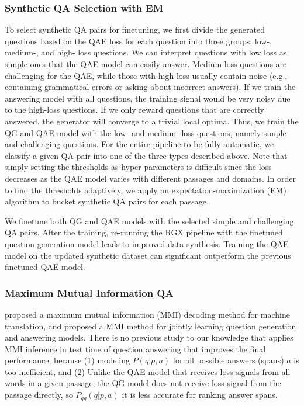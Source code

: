 \documentclass[11pt,a4paper]{article}
\begin{document}
\subsubsection{Synthetic QA Selection with EM}
To select synthetic QA pairs for finetuning, we first divide the generated questions based on the QAE loss for each question into three groups: low-, medium-, and high- loss questions. We can interpret questions with low loss as simple ones that the QAE model can easily answer. Medium-loss questions are challenging for the QAE, while those with high loss usually contain noise (e.g., containing grammatical errors or asking about incorrect answers). If we train the answering model with all questions, the training signal would be very noisy due to the high-loss questions. If we only reward questions that are correctly answered, the generator will converge to a trivial local optima. Thus, we train the QG and QAE model with the low- and medium- loss questions, namely simple and challenging questions. For the entire pipeline to be fully-automatic, we classify a given QA pair into one of the three types described above. Note that simply setting the thresholds as hyper-parameters is difficult since the loss decreases as the QAE model varies with different passages and domains. In order to find the thresholds adaptively, we apply an expectation-maximization (EM) algorithm to bucket synthetic QA pairs for each passage.

We finetune both QG and QAE models with the selected simple and challenging QA pairs. After the training, re-running the RGX pipeline with the finetuned question generation model leads to improved data synthesis. Training the QAE model on the updated synthetic dataset can significant outperform the previous finetuned QAE model.

\subsubsection{Maximum Mutual Information QA}
\citet{li2016mutual} proposed a maximum mutual information (MMI) decoding method for machine translation, and \citet{tang2017question} proposed a MMI method for jointly learning question generation and answering models. There is no previous study to our knowledge that applies MMI inference in test time of question answering that improves the final performance, because (1) modeling $P(q|p, a)$ for all possible answers (spans) $a$ is too inefficient, and (2) Unlike the QAE model that receives loss signals from all words in a given passage, the QG model does not receive loss signal from the passage directly, so $P_{qg}(q|p, a)$ it is less accurate for ranking answer spans.
\end{document}
